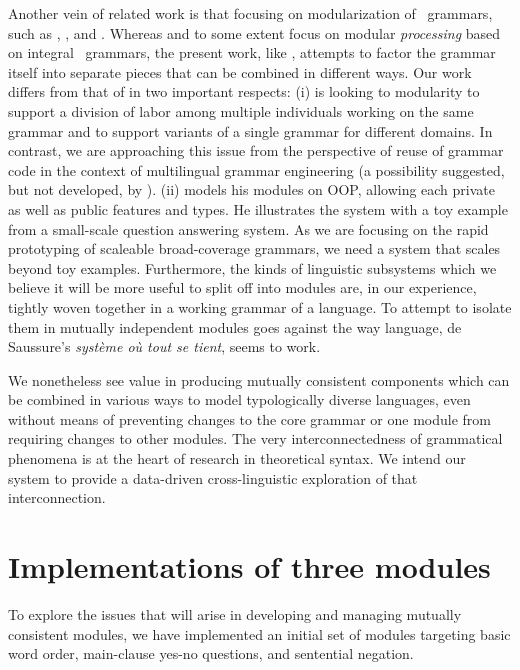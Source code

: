 Another vein of related work is that focusing on modularization of
\hpsg\ grammars, such as ,
, and . Whereas
\citeauthor{Kasper:Krieger:96} and to some extent
\citeauthor{Theofilidis:etal:97} focus on modular {\it processing}
based on integral \hpsg\ grammars, the present work, like
, attempts to factor the grammar itself into
separate pieces that can be combined in different ways.  Our work
differs from that of \citeauthor{Keselj:01} in two important respects:
(i) \citeauthor{Keselj:01} is looking to modularity to support a
division of labor among multiple individuals working on the same
grammar and to support variants of a single grammar for different
domains.  In contrast, we are approaching this issue from the
perspective of reuse of grammar code in the context of multilingual
grammar engineering (a possibility suggested, but not developed, by
). (ii) \citeauthor{Keselj:01} models
his modules on OOP, allowing each private as well as public features
and types.  He illustrates the system with a toy example from a
small-scale question answering system.  As we are focusing on the
rapid prototyping of scaleable broad-coverage grammars, we need 
a system that scales beyond toy examples.  Furthermore, the kinds
of linguistic subsystems which we believe it will be more useful
to split off into modules are, in our experience, tightly woven
together in a working grammar of a language.  To attempt to isolate
them in mutually independent modules goes against the way language,
de Saussure's {\it syst\`eme o\`u tout se tient}, seems to work.

We nonetheless see value in producing mutually consistent
components which can be combined in various ways to model
typologically diverse languages, even without means of 
preventing changes to the core grammar or one module from requiring
changes to other modules.  The very interconnectedness of grammatical
phenomena is at the heart of research in theoretical syntax.  We
intend our system to provide a data-driven cross-linguistic
exploration of that interconnection.

\section{Implementations of three modules}
\label{imp}

To explore the issues that will arise in developing and managing
mutually consistent modules, we have
implemented an initial set of modules targeting basic
word order, main-clause yes-no questions, and sentential negation.  


